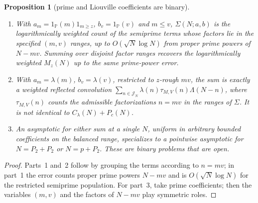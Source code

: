 \documentclass[final,11pt]{elsarticle}
\newtheorem{proposition}[theorem]{Proposition}
\theoremstyle{definition}
\theoremstyle{remark}
\newcommand{\PP}{\mathbb{P}}
\newcommand{\cband}{\mathcal{J}_N}
\numberwithin{equation}{section}
\begin{document}
\begin{proposition}[prime and Liouville coefficients are binary]\label{prop:binary}
\begin{enumerate}
\item With $a_m=1_\PP(m)1_{m\ge z}$, $b_v=1_\PP(v)$ and $m\le v$,
$\Sigma(N;a,b)$ is the logarithmically weighted count of the
semiprime terms whose factors lie in the specified $(m,v)$ ranges,
up to $O(\sqrt N\log N)$ from proper prime powers of $N-mv$.
Summing over disjoint factor ranges recovers the logarithmically
weighted $M_z(N)$ up to the same prime-power error.
\item With $a_m=\lambda(m)$, $b_v=\lambda(v)$, restricted to $z$-rough $mv$, the sum is exactly a weighted reflected convolution
$\sum_{n\in\cband}\lambda(n)\tau_{M,V}(n)\Lambda(N-n)$, where $\tau_{M,V}(n)$ counts the admissible factorizations $n=mv$ in the ranges of $\Sigma$. It is not identical to $C_\lambda(N)+P_c(N)$.
\item An asymptotic for either sum at a single $N$, uniform in arbitrary bounded coefficients on the balanced range, specializes to a pointwise asymptotic for $N=P_2+P_2$ or $N=p+P_2$. These are binary problems that are open.
\end{enumerate}
\end{proposition}

\begin{proof}
Parts~1 and~2 follow by grouping the terms according to $n=mv$; in part~1 the error counts proper prime powers $N-mv$ and is $O(\sqrt N\log N)$ for the restricted semiprime population. For part~3, take prime coefficients; then the variables $(m,v)$ and the factors of $N-mv$ play symmetric roles. \qedhere
\end{proof}
\end{document}
